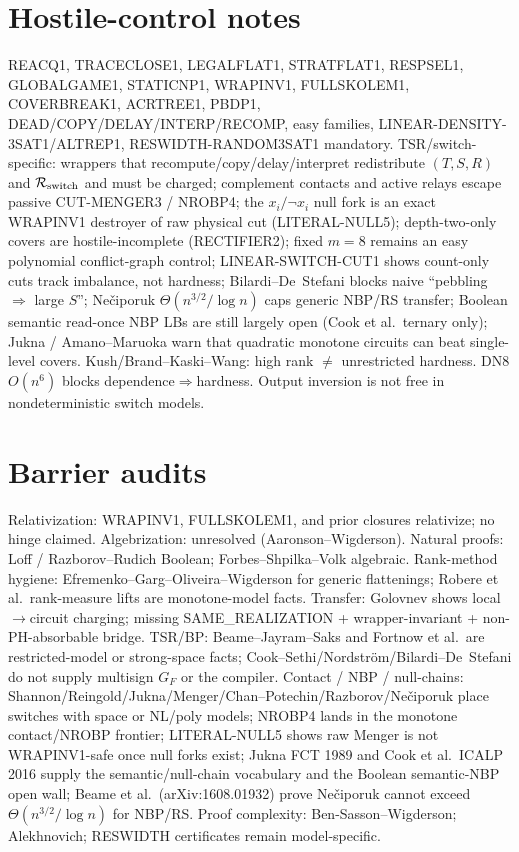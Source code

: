 \documentclass[11pt]{article}
\begin{document}
\section*{Hostile-control notes}
REACQ1, TRACECLOSE1, LEGALFLAT1, STRATFLAT1, RESPSEL1, GLOBALGAME1, STATICNP1, WRAPINV1,
FULLSKOLEM1, COVERBREAK1, ACRTREE1, PBDP1, DEAD/COPY/DELAY/INTERP/RECOMP, easy families,
LINEAR-DENSITY-3SAT1/ALTREP1, RESWIDTH-RANDOM3SAT1 mandatory.
TSR/switch-specific: wrappers that recompute/copy/delay/interpret redistribute $(T,S,R)$ and
$\mathcal R_{\rm switch}$ and must be charged; complement contacts and active relays escape
passive CUT-MENGER3 / NROBP4; the $x_i/\neg x_i$ null fork is an exact WRAPINV1 destroyer of
raw physical cut (LITERAL-NULL5); depth-two-only covers are hostile-incomplete (RECTIFIER2);
fixed $m=8$ remains an easy polynomial conflict-graph control;
LINEAR-SWITCH-CUT1 shows count-only cuts track imbalance, not hardness;
Bilardi--De~Stefani blocks naive ``pebbling $\Rightarrow$ large $S$'';
Ne\v{c}iporuk $\Theta(n^{3/2}/\log n)$ caps generic NBP/RS transfer;
Boolean semantic read-once NBP LBs are still largely open (Cook et al.\ ternary only);
Jukna / Amano--Maruoka warn that quadratic monotone circuits can beat single-level covers.
Kush/Brand--Kaski--Wang: high rank $\neq$ unrestricted hardness.
DN8 $O(n^6)$ blocks dependence$\Rightarrow$hardness.
Output inversion is not free in nondeterministic switch models.

\section*{Barrier audits}
Relativization: WRAPINV1, FULLSKOLEM1, and prior closures relativize; no hinge claimed.
Algebrization: unresolved (Aaronson--Wigderson).
Natural proofs: Loff / Razborov--Rudich Boolean; Forbes--Shpilka--Volk algebraic.
Rank-method hygiene: Efremenko--Garg--Oliveira--Wigderson for generic flattenings;
Robere et al.\ rank-measure lifts are monotone-model facts.
Transfer: Golovnev shows local$\to$circuit charging; missing SAME\_REALIZATION + wrapper-invariant
+ non-PH-absorbable bridge.
TSR/BP: Beame--Jayram--Saks and Fortnow et al.\ are restricted-model or strong-space facts;
Cook--Sethi/Nordstr\"om/Bilardi--De~Stefani do not supply multisign $G_F$ or the compiler.
Contact / NBP / null-chains: Shannon/Reingold/Jukna/Menger/Chan--Potechin/Razborov/Ne\v{c}iporuk
place switches with space or NL/poly models; NROBP4 lands in the monotone contact/NROBP
frontier; LITERAL-NULL5 shows raw Menger is not WRAPINV1-safe once null forks exist;
Jukna FCT 1989 and Cook et al.\ ICALP 2016 supply the semantic/null-chain vocabulary and
the Boolean semantic-NBP open wall; Beame et al.\ (arXiv:1608.01932) prove Ne\v{c}iporuk
cannot exceed $\Theta(n^{3/2}/\log n)$ for NBP/RS.
Proof complexity: Ben-Sasson--Wigderson; Alekhnovich; RESWIDTH certificates remain model-specific.
\end{document}
